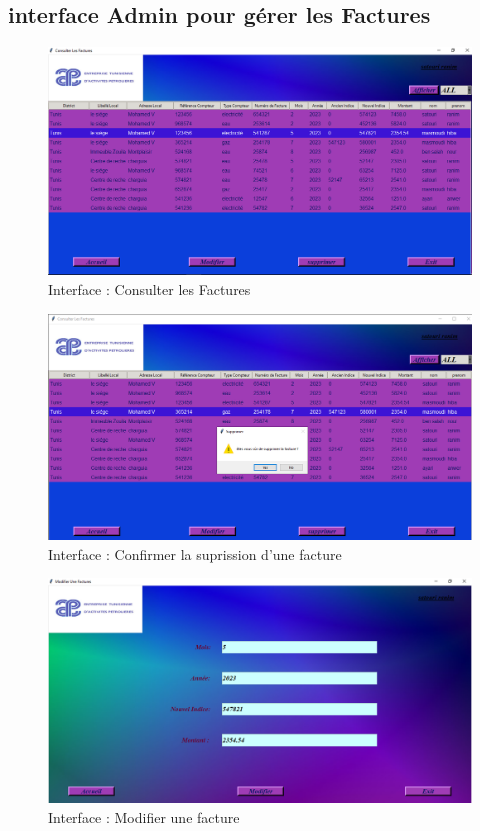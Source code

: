 \documentclass[12pt]{report}
\begin{document}
\subsection{interface Admin pour gérer les Factures}
\begin{figure}[H]
  \centering
  \includegraphics[scale=0.47]{Get_facture}
  \caption{Interface : Consulter les Factures}
  \label{fig:votre-label}
\end{figure}
\begin{figure}[H]
  \centering
  \includegraphics[scale=0.47]{delete_fact}
  \caption{Interface : Confirmer la suprission d'une facture}
  \label{fig:votre-label}
\end{figure}
\begin{figure}[H]
  \centering
  \includegraphics[scale=0.47]{update_fact}
  \caption{Interface : Modifier une facture}
  \label{fig:votre-label}
\end{figure}
\end{document}

